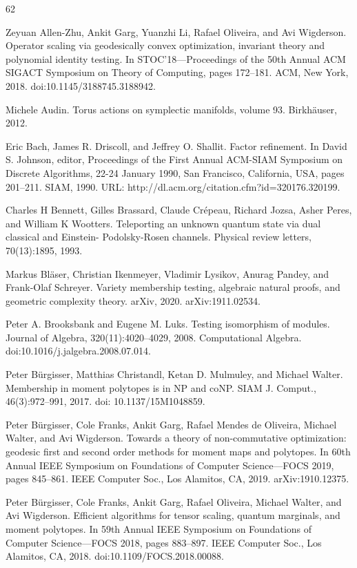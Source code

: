 \begin{thebibliography}{62}

Zeyuan Allen-Zhu, Ankit Garg, Yuanzhi Li, Rafael Oliveira, and Avi Wigderson. Operator scaling via geodesically convex optimization, invariant theory and polynomial identity testing. In STOC’18—Proceedings of the 50th Annual ACM SIGACT Symposium on Theory of Computing, pages 172–181. ACM, New York, 2018. doi:10.1145/3188745.3188942.

Michele Audin. Torus actions on symplectic manifolds, volume 93. Birkhäuser, 2012.

Eric Bach, James R. Driscoll, and Jeffrey O. Shallit. Factor refinement. In David S. Johnson, editor, Proceedings of the First Annual ACM-SIAM Symposium on Discrete Algorithms, 22-24 January 1990, San Francisco, California, USA, pages 201–211. SIAM, 1990. URL: http://dl.acm.org/citation.cfm?id=320176.320199.

Charles H Bennett, Gilles Brassard, Claude Crépeau, Richard Jozsa, Asher Peres, and William K Wootters. Teleporting an unknown quantum state via dual classical and Einstein- Podolsky-Rosen channels. Physical review letters, 70(13):1895, 1993.

Markus Bläser, Christian Ikenmeyer, Vladimir Lysikov, Anurag Pandey, and Frank-Olaf Schreyer. Variety membership testing, algebraic natural proofs, and geometric complexity theory. arXiv, 2020. arXiv:1911.02534.

Peter A. Brooksbank and Eugene M. Luks. Testing isomorphism of modules. Journal of Algebra, 320(11):4020–4029, 2008. Computational Algebra. doi:10.1016/j.jalgebra.2008.07.014.

Peter Bürgisser, Matthias Christandl, Ketan D. Mulmuley, and Michael Walter. Membership in moment polytopes is in NP and coNP. SIAM J. Comput., 46(3):972–991, 2017. doi: 10.1137/15M1048859.

Peter Bürgisser, Cole Franks, Ankit Garg, Rafael Mendes de Oliveira, Michael Walter, and Avi Wigderson. Towards a theory of non-commutative optimization: geodesic first and second order methods for moment maps and polytopes. In 60th Annual IEEE Symposium on Foundations of Computer Science—FOCS 2019, pages 845–861. IEEE Computer Soc., Los Alamitos, CA, 2019. arXiv:1910.12375.

Peter Bürgisser, Cole Franks, Ankit Garg, Rafael Oliveira, Michael Walter, and Avi Wigderson. Efficient algorithms for tensor scaling, quantum marginals, and moment polytopes. In 59th Annual IEEE Symposium on Foundations of Computer Science—FOCS 2018, pages 883–897. IEEE Computer Soc., Los Alamitos, CA, 2018. doi:10.1109/FOCS.2018.00088.


\end{thebibliography}
